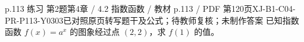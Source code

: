 \par\noindent\begin{minipage}{\linewidth}
\begin{bankitem}{p.113 练习 第2题}{第4章 / 4.2 指数函数 / 教材 p.113 / PDF 第120页}{XJ-B1-C04-PR-P113-Y0303}{已对照原页转写题干及公式；待教师复核；未制作答案}
已知指数函数 $f(x)=a^x$ 的图象经过点 $(2,2)$，求 $f(1)$ 的值。
\end{bankitem}
\end{minipage}\par\medskip
